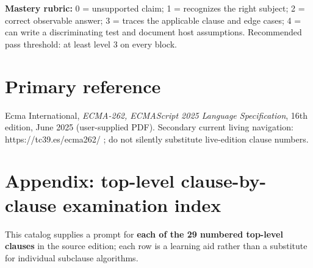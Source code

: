 \documentclass[11pt,letterpaper]{article}
\begin{document}
\textbf{Mastery rubric:} 0 = unsupported claim; 1 = recognizes the right subject; 2 = correct observable answer; 3 = traces the applicable clause and edge cases; 4 = can write a discriminating test and document host assumptions. Recommended pass threshold: at least level 3 on every block.

\section{Primary reference}\label{primary-reference}

Ecma International, \emph{ECMA-262, ECMAScript 2025 Language Specification}, 16th edition, June 2025 (user-supplied PDF). Secondary current living navigation: https://tc39.es/ecma262/ ; do not silently substitute live-edition clause numbers.

\section{Appendix: top-level clause-by-clause examination index}\label{appendix-top-level-clause-by-clause-examination-index}

This catalog supplies a prompt for \textbf{each of the 29 numbered top-level clauses} in the source edition; each row is a learning aid rather than a substitute for individual subclause algorithms.
\end{document}

